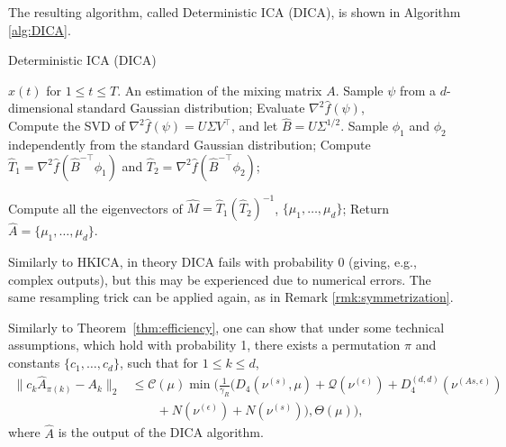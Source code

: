 \documentclass[11pt]{article}
\newcommand{\EA}[1]{\mathcal{E}^A_{#1}}
\newcommand{\Epsi}{\EA{\psi}}
\newcommand{\Ephi}{\EA{\phi}}
\newcommand{\cQ}{\mathcal{Q}}
\newcommand{\eps}{\epsilon}
\begin{document}
The resulting algorithm, called Deterministic ICA (DICA), is shown in Algorithm \ref{alg:DICA}. 
\begin{algorithm}
	\caption{Deterministic ICA (DICA)}
	\label{alg:DICA}
	\begin{algorithmic}[1]
		\INPUT $x(t)$ for $1\le t \le T$. 
		\OUTPUT An estimation of the mixing matrix $A$. 
		\STATE Sample $\psi$ from a $d$-dimensional standard Gaussian distribution;
		\STATE Evaluate $\nabla^2\hat{f}(\psi)$, \\
		\STATE Compute the SVD of $\nabla^2\hat{f}(\psi) = U \Sigma V^{\top}$, and let $\hat{B} =  U \Sigma^{1/2}$.
		\STATE Sample $\phi_1$ and $\phi_2$ independently from the standard Gaussian distribution;
		\STATE Compute $\hat{T}_1 =\nabla^2\hat{f}(\hat{B}^{-\top}\phi_1)$ and  $\hat{T}_2 =\nabla^2\hat{f}(\hat{B}^{-\top}\phi_2)$;
		
		\STATE Compute all the eigenvectors of $\hat{M} = \hat{T}_1\left(\hat{T}_2\right)^{-1}$, $\{\mu_1,\ldots,\mu_d\}$;
		\STATE Return $\hat{A} = \{\mu_1,\ldots,\mu_d\}$.
	\end{algorithmic}
\end{algorithm}
\begin{remark}
	Similarly to HKICA, in theory DICA fails with probability 0 (giving, e.g., complex outputs), but this may be experienced due to numerical errors.
	The same resampling trick can be applied again, as in Remark \ref{rmk:symmetrization}. 
\end{remark}

Similarly to Theorem~\ref{thm:efficiency}, one can show that under some technical assumptions, which 
hold with probability 1, 
there exists a permutation $\pi$ and constants $\{c_1,\ldots,c_d\}$, such that for $1\le k\le d$,
\begin{align*}
\| c_k\hat{A}_{\pi(k)} - A_k\|_2 & \le \mathcal{C}(\mu)\min\Big(\frac{1}{\gamma_R} (D_4(\nu^{(s)},\mu)+ \cQ(\nu^{(\eps)}) + D_4^{(d,d)}(\nu^{(As,\eps)}) \\
& \qquad 
+N(\nu^{(\eps)}) + N( \nu^{(s)})), \Theta(\mu) \Big),
\end{align*}
where $\hat{A}$ is the output of the DICA algorithm. 
\end{document}
